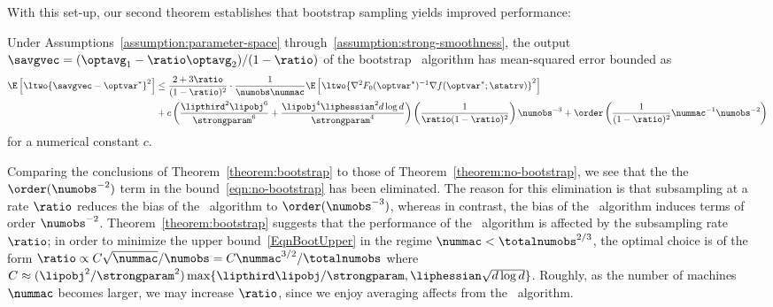 \documentclass[11pt,twoside]{article}
\theoremstyle{definition}
\begin{document}
With this set-up, our second theorem establishes that
bootstrap sampling yields improved performance:
\begin{theorem}
  \label{theorem:bootstrap}
  Under Assumptions~\ref{assumption:parameter-space}
  through~\ref{assumption:strong-smoothness}, the output $\savgvec =
  (\optavg_1 - \ratio\optavg_2) / (1 - \ratio)$ of the bootstrap
  \savgm\ algorithm has mean-squared error bounded as
  \begin{align}
\label{EqnBootUpper}
    \E\left[\ltwo{\savgvec - \optvar^*}^2\right] & \le \frac{2 + 3
      \ratio}{(1 - \ratio)^2} \cdot \frac{1}{\numobs \nummac }
    \E\left[\ltwo{\nabla^2 F_0(\optvar^*)^{-1} \nabla f(\optvar^*;
        \statrv)}^2\right] \\
    &  + c\left(\frac{\lipthird^2 \lipobj^6}{\strongparam^6} +
    \frac{\lipobj^4 \liphessian^2 d \log d}{\strongparam^4}\right)
    \left(\frac{1}{\ratio(1 - \ratio)^2}\right) \numobs^{-3} +
    \order\left(\frac{1}{(1 - \ratio)^2}\nummac^{-1}
    \numobs^{-2}\right) \nonumber
  \end{align}
  for a numerical constant $c$.
\end{theorem}

Comparing the conclusions of Theorem~\ref{theorem:bootstrap} to those
of Theorem~\ref{theorem:no-bootstrap}, we see that the the
$\order(\numobs^{-2})$ term in the bound~\eqref{eqn:no-bootstrap} has
been eliminated.  The reason for this elimination is that subsampling
at a rate $\ratio$ reduces the bias of the \savgm\ algorithm to
$\order(\numobs^{-3})$, whereas in contrast, the bias of the
\avgm\ algorithm induces terms of order $\numobs^{-2}$.
Theorem~\ref{theorem:bootstrap} suggests that the performance of the
\savgm\ algorithm is affected by the subsampling rate $\ratio$; in
order to minimize the upper bound~\eqref{EqnBootUpper} in the regime
$\nummac < \totalnumobs^{2/3}$, the optimal choice is of the form
$\ratio \propto C \sqrt{\nummac} / \numobs = C \nummac^{3/2} /
\totalnumobs$ where \mbox{$C \approx (\lipobj^2 / \strongparam^2)
  \max\{\lipthird \lipobj / \strongparam, \liphessian \sqrt{d \log
    d}\}$.}  Roughly, as the number of machines $\nummac$ becomes
larger, we may increase $\ratio$, since we enjoy averaging affects
from the \savgm\ algorithm.

\newcommand{\stddev}{\sigma}
\end{document}
